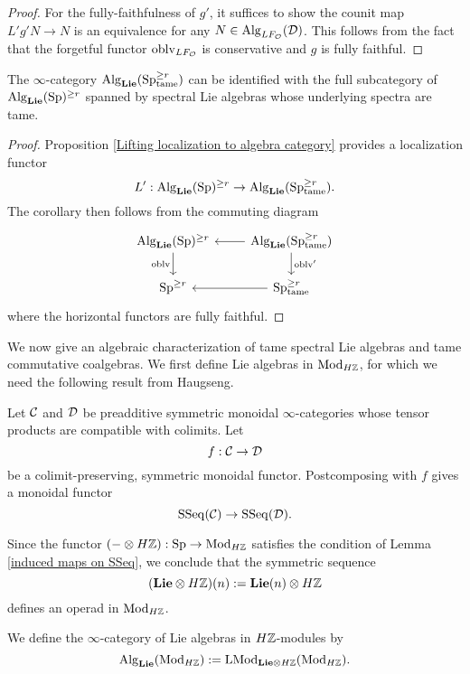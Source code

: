 \begin{proof}
    For the fully-faithfulness of $g'$, it suffices to show the counit map 
    $L'g'N \to N$ is an equivalence for any $N\in \operatorname{Alg}_{LF_{{\mathcal{O}}}}({\mathcal{D}})$. This follows from the fact that the forgetful functor $\operatorname{oblv}_{LF_{{\mathcal{O}}}}$ is conservative and $g$ is fully faithful.
\end{proof}

\begin{corollary}
\label{Identification of tame Lie algebras}
	The $\infty$-category $\operatorname{Alg}_{\mathbf{Lie}}(\operatorname{Sp}^{\geq r}_{\operatorname{\operatorname{tame}}})$ can be identified with the full subcategory of $\operatorname{Alg}_{\mathbf{Lie}}(\operatorname{Sp})^{\geq r}$ spanned by spectral Lie algebras whose underlying spectra are tame.
\end{corollary}
\begin{proof}
    Proposition \ref{Lifting localization to algebra category} provides a localization functor
	$$
	L': \operatorname{Alg}_{\mathbf{Lie}}(\operatorname{Sp})^{\geq r} \to \operatorname{Alg}_{\mathbf{Lie}}(\operatorname{Sp}^{\geq r}_{\operatorname{\operatorname{tame}}}).
	$$
	The corollary then follows from the commuting diagram
\[
\begin{tikzcd}
	\Alg_{\spLie}(\Sp)^{\geq r} & \Alg_{\spLie}(\Sp^{\geq r}_{\tame})\\
	\Sp^{\geq r}  & 
	\Sp^{\geq r}_{\tame}
	\arrow[from=1-2, to= 1-1]
	\arrow[from=1-1, to=2-1, "\oblv" left]
	\arrow[from=1-2, to=2-2, "\oblv'" ]
	\arrow[from=2-2, to= 2-1]
\end{tikzcd}
\]
where the horizontal functors are fully faithful. 

\end{proof}


We now give an algebraic characterization of tame spectral Lie algebras and tame commutative coalgebras.
We first define Lie algebras in $\operatorname{Mod}_{H{\mathbb{Z}}}$, for which we need the following result from Haugseng.
\begin{lemma}
\label{induced maps on SSeq}
\cite[Corollary 4.2.9.]{Haugsengsymseq}
Let ${\mathcal{C}}$ and ${\mathcal{D}}$ be preadditive symmetric monoidal $\infty$-categories whose tensor products are compatible with colimits. Let
$$
f: {\mathcal{C}} \to {\mathcal{D}}
$$
be a colimit-preserving, symmetric monoidal functor.
Postcomposing with $f$ gives a monoidal functor
$$
\operatorname{SSeq}({\mathcal{C}}) \to 
\operatorname{SSeq}({\mathcal{D}}).
$$
\end{lemma}	
Since the functor 
$(-\otimes H{\mathbb{Z}}):\operatorname{Sp} \to \operatorname{Mod}_{H{\mathbb{Z}}}$ satisfies the condition of Lemma \ref{induced maps on SSeq}, we conclude that the symmetric sequence
$$
(\mathbf{Lie}\otimes H{\mathbb{Z}})(n) := \mathbf{Lie}(n)\otimes H{\mathbb{Z}}
$$ defines an operad in $\operatorname{Mod}_{H{\mathbb{Z}}}$.
\begin{definition}
We define the $\infty$-category of Lie algebras in $H{\mathbb{Z}}$-modules by 
$$
\operatorname{Alg}_{\mathbf{Lie}}(\operatorname{Mod}_{H{\mathbb{Z}}}): = \operatorname{LMod}_{\mathbf{Lie}\otimes H{\mathbb{Z}}}(\operatorname{Mod}_{H{\mathbb{Z}}}).
$$
\end{definition}

